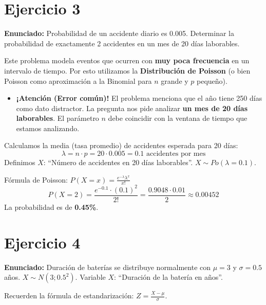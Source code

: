 \documentclass[11pt, a4paper]{article}
\begin{document}
\section*{Ejercicio 3}
\textbf{Enunciado:} Probabilidad de un accidente diario es 0.005. Determinar la probabilidad de exactamente 2 accidentes en un mes de 20 días laborables.

Este problema modela eventos que ocurren con \textbf{muy poca frecuencia} en un intervalo de tiempo. Por esto utilizamos la \textbf{Distribución de Poisson} (o bien Poisson como aproximación a la Binomial para $n$ grande y $p$ pequeño).

\begin{itemize}
    \item \textbf{¡Atención (Error común)!} El problema menciona que el año tiene 250 días como dato distractor. La pregunta nos pide analizar \textbf{un mes de 20 días laborables}. El parámetro $n$ debe coincidir con la ventana de tiempo que estamos analizando.
\end{itemize}

Calculamos la media (tasa promedio) de accidentes esperada para 20 días:
\begin{equation*}
\lambda = n \cdot p = 20 \cdot 0.005 = 0.1 \text{ accidentes por mes}
\end{equation*}
Definimos $X$: ``Número de accidentes en 20 días laborables''. $X \sim Po(\lambda = 0.1)$.

Fórmula de Poisson: $P(X = x) = \frac{e^{-\lambda} \lambda^x}{x!}$
\begin{equation*}
P(X = 2) = \frac{e^{-0.1} \cdot (0.1)^2}{2!} = \frac{0.9048 \cdot 0.01}{2} \approx 0.00452
\end{equation*}
La probabilidad es de \textbf{0.45\%}.


\section*{Ejercicio 4}
\textbf{Enunciado:} Duración de baterías se distribuye normalmente con $\mu = 3$ y $\sigma = 0.5$ años. $X \sim N(3; 0.5^2)$. Variable $X$: ``Duración de la batería en años''.

Recuerden la fórmula de estandarización: $Z = \frac{X - \mu}{\sigma}$.
\end{document}
